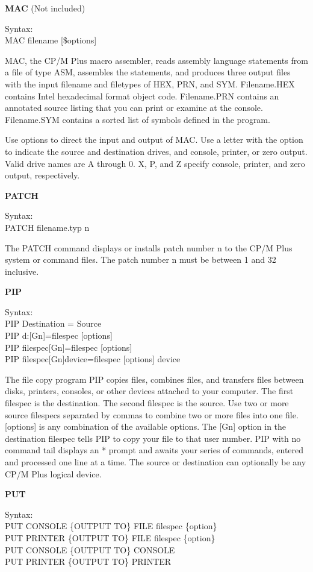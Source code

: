 \textbf{MAC} (Not included)

\hangindent=0.7cm Syntax:\\
MAC filename [\$options]

MAC, the CP/M Plus macro assembler, reads assembly language statements
from a file of type ASM, assembles the statements, and produces three
output files with the input filename and filetypes of HEX, PRN, and
SYM. Filename.HEX contains Intel hexadecimal format object
code. Filename.PRN contains an annotated source listing that you can
print or examine at the console. Filename.SYM contains a sorted list
of symbols defined in the program.

Use options to direct the input and output of MAC. Use a letter with
the option to indicate the source and destination drives, and console,
printer, or zero output. Valid drive names are A through 0. X, P, and
Z specify console, printer, and zero output, respectively.

\textbf{PATCH}

\hangindent=0.7cm Syntax:\\
PATCH filename.typ n

The PATCH command displays or installs patch number n to the CP/M Plus
system or command files. The patch number n must be between 1 and 32
inclusive.

\textbf{PIP}

\hangindent=0.7cm Syntax:\\
PIP Destination = Source\\
PIP d:[Gn]=filespec [options]\\
PIP filespec[Gn]=filespec [options]\\
PIP filespec[Gn]device=filespec [options] device

The file copy program PIP copies files, combines files, and transfers
files between disks, printers, consoles, or other devices attached to
your computer. The first filespec is the destination. The second
filespec is the source. Use two or more source filespecs separated by
commas to combine two or more files into one file. [options] is any
combination of the available options. The [Gn] option in the
destination filespec tells PIP to copy your file to that user
number. PIP with no command tail displays an * prompt and awaits your
series of commands, entered and processed one line at a time. The
source or destination can optionally be any CP/M Plus logical device.

\textbf{PUT}

\hangindent=0.7cm Syntax:\\
PUT CONSOLE \{OUTPUT TO\} FILE filespec \{option\}\\
PUT PRINTER \{OUTPUT TO\} FILE filespec \{option\}\\
PUT CONSOLE \{OUTPUT TO\} CONSOLE\\
PUT PRINTER \{OUTPUT TO\} PRINTER

